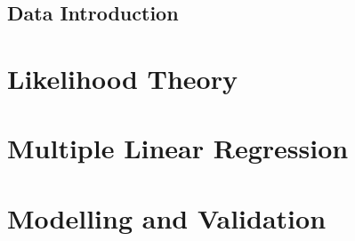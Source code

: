 % 
\section{Data Introduction}

\chapter{Likelihood Theory}
\label{ch:likelihood_theory}

\chapter{Multiple Linear Regression}\label{ch:Multip_linear_regresssion}



\chapter{Modelling and Validation}
\label{ch:hypothesis_testing}


%